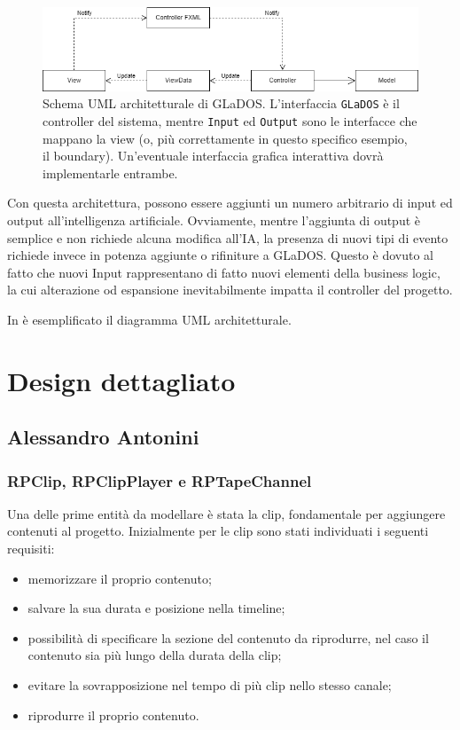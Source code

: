 \documentclass[a4paper,12pt]{report}
\begin{document}
\begin{figure}[h]
\centering{}
\includegraphics[width=\textwidth]{img/arch}
\caption{Schema UML architetturale di GLaDOS. L'interfaccia \texttt{GLaDOS} è il controller del sistema, mentre \texttt{Input} ed \texttt{Output} sono le interfacce che mappano la view (o, più correttamente in questo specifico esempio, il boundary). Un'eventuale interfaccia grafica interattiva dovrà implementarle entrambe.}
\label{img:goodarch}
\end{figure}

Con questa architettura, possono essere aggiunti un numero arbitrario di input ed output
all'intelligenza artificiale.
%
Ovviamente, mentre l'aggiunta di output è semplice e non richiede alcuna modifica all'IA, la
presenza di nuovi tipi di evento richiede invece in potenza aggiunte o rifiniture a GLaDOS.
%
Questo è dovuto al fatto che nuovi Input rappresentano di fatto nuovi elementi della business
logic, la cui alterazione od espansione inevitabilmente impatta il controller del progetto.

In  è esemplificato il diagramma UML architetturale.


\section{Design dettagliato}

\subsection{Alessandro Antonini}

\subsubsection{RPClip, RPClipPlayer e RPTapeChannel}
Una delle prime entità da modellare è stata la clip, fondamentale per aggiungere contenuti al progetto.
Inizialmente per le clip sono stati individuati i seguenti requisiti: 
\begin{itemize}
    \item memorizzare il proprio contenuto;
    \item salvare la sua durata e posizione nella timeline;
    \item possibilità di specificare la sezione del contenuto da riprodurre, nel caso il contenuto sia più lungo della durata della clip;
    \item evitare la sovrapposizione nel tempo di più clip nello stesso canale;
    \item riprodurre il proprio contenuto.
\end{itemize}
\end{document}
